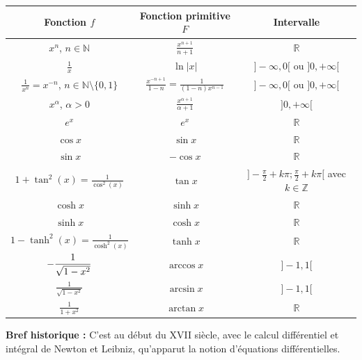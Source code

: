 \documentclass[french]{book}
\renewcommand{\arraystretch}{1.2}
\begin{document}
\renewcommand\arraystretch{2}
\begin{center}
\begin{tabular}{|c|c|c|}
\hline
 Fonction $f$     &Fonction primitive $F$& Intervalle   \\
 \hline
 \rule[-2.5ex]{0pt}{6ex}
$x^n$, $n\in{\mathbb N}$  &$\displaystyle\frac{x^{n+1}}{n+1}$&${\mathbb R}$  \\
 \hline
\rule[-2.5ex]{0pt}{6ex}
$\displaystyle\frac{1}{x}$ &$\ln\vert x\vert$&$]-\infty,0[$ ou $]0,+\infty[$  \\
 \hline
\rule[-2.5ex]{0pt}{6ex}
$\displaystyle\frac{1}{x^n}=x^{-n}$, $n\in{\mathbb N}\setminus\{0,1\}$  &$\displaystyle\frac{x^{-n+1}}{1-n}=\frac{1}{(1-n)x^{n-1}}$&$]-\infty,0[$ ou $]0,+\infty[$  \\
\hline
\rule[-2.5ex]{0pt}{6ex}
$x^{\alpha}$, $\alpha>0$  &$\displaystyle\frac{x^{\alpha+1}}{\alpha+1}$&$]0,+\infty[$  \\
 \hline\hline
 $e^x$   &$e^x$&${\mathbb R}$  \\
 \hline\hline
 $\cos x$    &$\sin x$&${\mathbb R}$  \\
 \hline
 $\sin x$     &$-\cos x$&${\mathbb R}$  \\
  \hline
\rule[-2.5ex]{0pt}{6ex}  $1+\tan^2( x)= \displaystyle\frac{1}{\cos^2(x)}$&$\tan x$ &$]-\frac{\pi}{2}+k\pi;\frac{\pi}{2}+k\pi[$ avec $k\in{\mathbb Z}$  \\
 \hline
  \hline
 $\cosh x$    &$\sinh x$&${\mathbb R}$  \\
 \hline
 $\sinh x$   &$\cosh x$&${\mathbb R}$  \\
 \hline
 \rule[-2.5ex]{0pt}{6ex}  $1-\tanh^2(x)= \displaystyle\frac{1}{\cosh^2(x)}$&$\tanh x$&${\mathbb R}$  \\
 \hline\hline
\rule[-2.5ex]{0pt}{6ex}     $-\displaystyle \displaystyle\frac{1}{\sqrt{1-x^2}}$&$\arccos x$ &$]-1,1[$  \\
 \hline
\rule[-2.5ex]{0pt}{6ex}   $\displaystyle\frac{1}{\sqrt{1-x^2}}$& $\arcsin x$ &$]-1,1[$  \\
 \hline
\rule[-2.5ex]{0pt}{6ex}     $\displaystyle\frac{1}{1+x^2}$& $\arctan x$&${\mathbb R}$  \\
 \hline
\end{tabular}
\end{center}

\newpage
\textbf{Bref historique :} C'est au début du  XVII siècle, avec le calcul différentiel et intégral de Newton et
Leibniz, qu'apparut la notion d'équations différentielles.
\end{document}
